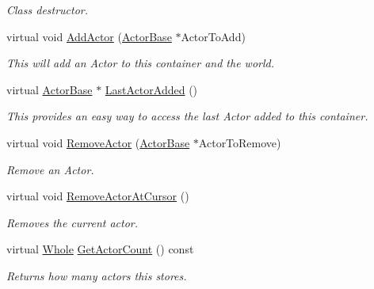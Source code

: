 \begin{DoxyCompactItemize}
\begin{DoxyCompactList}\small\item\em Class destructor. \item\end{DoxyCompactList}\item 
virtual void \hyperlink{classphys_1_1ActorContainerVector_a4bc3e38f16caddee021a97739bebaf6e}{AddActor} (\hyperlink{classphys_1_1ActorBase}{ActorBase} $\ast$ActorToAdd)
\begin{DoxyCompactList}\small\item\em This will add an Actor to this container and the world. \item\end{DoxyCompactList}\item 
virtual \hyperlink{classphys_1_1ActorBase}{ActorBase} $\ast$ \hyperlink{classphys_1_1ActorContainerVector_a49e643bdeff78521de9c4a9fea59a0d2}{LastActorAdded} ()
\begin{DoxyCompactList}\small\item\em This provides an easy way to access the last Actor added to this container. \item\end{DoxyCompactList}\item 
virtual void \hyperlink{classphys_1_1ActorContainerVector_aeee5bd81601faed85e6a35f576c8d476}{RemoveActor} (\hyperlink{classphys_1_1ActorBase}{ActorBase} $\ast$ActorToRemove)
\begin{DoxyCompactList}\small\item\em Remove an Actor. \item\end{DoxyCompactList}\item 
virtual void \hyperlink{classphys_1_1ActorContainerVector_a430977daf010a25f53df6cf37954f8ca}{RemoveActorAtCursor} ()
\begin{DoxyCompactList}\small\item\em Removes the current actor. \item\end{DoxyCompactList}\item 
virtual \hyperlink{namespacephys_a460f6bc24c8dd347b05e0366ae34f34a}{Whole} \hyperlink{classphys_1_1ActorContainerVector_a6d2e5e68e23f5798ad10ba41e479d0f7}{GetActorCount} () const 
\begin{DoxyCompactList}\small\item\em Returns how many actors this stores. \item\end{DoxyCompactList}\item 

\end{DoxyCompactItemize}
